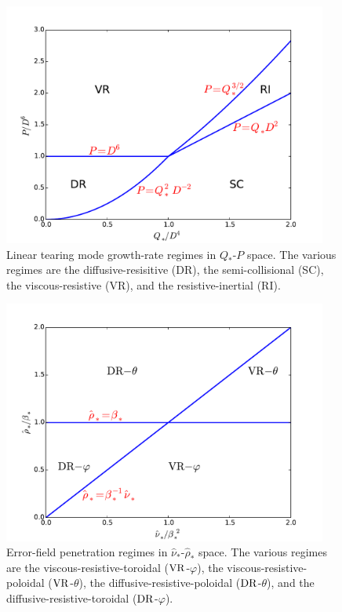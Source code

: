 \documentclass[12pt,prb,aps]{revtex4-1}
\begin{document}
\begin{figure}
\centerline{\includegraphics[width=0.95\textwidth]{RegimeIII.pdf}}
\caption{Linear tearing mode growth-rate regimes  in $Q_\ast$-$P$ space. The various regimes are
the diffusive-resisitive (DR), the semi-collisional (SC),  the viscous-resistive (VR), and the resistive-inertial (RI).}\label{f3}
\end{figure}

\begin{figure}
\centerline{\includegraphics[width=0.95\textwidth]{Scaling.pdf}}
\caption{Error-field penetration regimes in $\hat{\nu}_\ast$-$\hat{\rho}_\ast$ space. The various regimes are the
viscous-resistive-toroidal (${\rm VR}$-$\varphi$), the viscous-resistive-poloidal (${\rm VR}$-$\theta$), the diffusive-resistive-poloidal (${\rm DR}$-$\theta$), and the  diffusive-resistive-toroidal (${\rm DR}$-$\varphi$). }\label{f6}
\end{figure}
\end{document}
